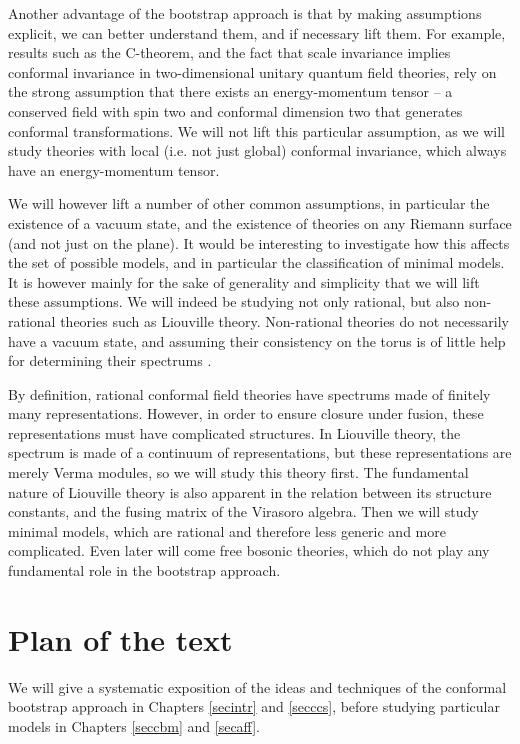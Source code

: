 \documentclass[12pt, a4paper, notitlepage, twoside]{report}
\numberwithin{equation}{section}
\theoremstyle{break}
\begin{document}
Another advantage of the bootstrap approach is that by making assumptions explicit, we can better understand them, and if necessary lift them.
For example, results such as the C-theorem, and the fact that scale invariance implies conformal invariance in two-dimensional unitary quantum field theories, rely on the strong assumption that there exists an energy-momentum tensor -- a conserved field with spin two and conformal dimension two that generates conformal transformations.
We will not lift this particular assumption, as we will study theories with local (i.e.
not just global) conformal invariance, which always have an energy-momentum tensor.

We will however lift a number of other common assumptions, in particular the existence of a vacuum state, and the existence of theories on any Riemann surface (and not just on the plane).
It would be interesting to investigate how this affects the set of possible models, and in particular the classification of minimal models.
It is however mainly for the sake of generality and simplicity that
we will lift these assumptions.
We will indeed be studying not only rational, but also non-rational theories such as Liouville theory.
Non-rational theories do not necessarily have a vacuum state, and assuming their consistency on the torus is of little help for determining their spectrums \cite{rib14c}. 

By definition, rational conformal field theories have spectrums made of finitely many representations.
However, in order to ensure closure under fusion, these representations must have complicated structures.
In Liouville theory, the spectrum is made of a continuum of representations, but these representations are merely Verma modules, so we will study this theory first. The fundamental nature of Liouville theory is also apparent in the relation between its structure constants, and the fusing matrix of the Virasoro algebra.
Then we will study minimal models, which are rational and therefore less generic and more complicated.
Even later will come free bosonic theories, which do not play any fundamental role in the bootstrap approach.


\section{Plan of the text \label{secplan}}

We will give a systematic exposition of the ideas and techniques of the conformal bootstrap approach in Chapters \ref{secintr} and \ref{secccs}, before studying particular models in Chapters \ref{seccbm} and \ref{secaff}.
\end{document}
